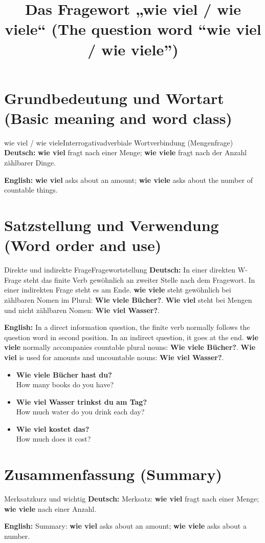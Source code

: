 \documentclass[a4paper,11pt]{article}
\title{Das Fragewort „wie viel / wie viele“ (The question word “wie viel / wie viele”)}
\date{}
\newcommand{\GermanText}[1]{\textbf{Deutsch: }#1\par}
\newcommand{\EnglishText}[1]{{\small\color{SoftGray}\textbf{English: }#1\par}}
\newcommand{\ExampleItem}[2]{\item \textbf{#1}\\{\small\color{SoftGray}#2}}
\begin{document}
\maketitle
\tableofcontents
\newpage
\section{Grundbedeutung und Wortart (Basic meaning and word class)}
\begin{grammarentry}{wie viel / wie viele}{Interrogativadverbiale Wortverbindung (Mengenfrage)}
\GermanText{\textbf{wie viel} fragt nach einer Menge; \textbf{wie viele} fragt nach der Anzahl zählbarer Dinge.}
\EnglishText{\textbf{wie viel} asks about an amount; \textbf{wie viele} asks about the number of countable things.}

\end{grammarentry}
\section{Satzstellung und Verwendung (Word order and use)}
\begin{grammarentry}{Direkte und indirekte Frage}{Fragewortstellung}
\GermanText{In einer direkten W-Frage steht das finite Verb gewöhnlich an zweiter Stelle nach dem Fragewort. In einer indirekten Frage steht es am Ende. \textbf{wie viele} steht gewöhnlich bei zählbaren Nomen im Plural: \textbf{Wie viele Bücher?}. \textbf{Wie viel} steht bei Mengen und nicht zählbaren Nomen: \textbf{Wie viel Wasser?}.}
\EnglishText{In a direct information question, the finite verb normally follows the question word in second position. In an indirect question, it goes at the end. \textbf{wie viele} normally accompanies countable plural nouns: \textbf{Wie viele Bücher?}. \textbf{Wie viel} is used for amounts and uncountable nouns: \textbf{Wie viel Wasser?}.}
\end{grammarentry}
\begin{exbox}\begin{itemize}
\ExampleItem{Wie viele Bücher hast du?}{How many books do you have?}
\ExampleItem{Wie viel Wasser trinkst du am Tag?}{How much water do you drink each day?}
\ExampleItem{Wie viel kostet das?}{How much does it cost?}
\end{itemize}\end{exbox}
\section{Zusammenfassung (Summary)}
\begin{grammarentry}{Merksatz}{kurz und wichtig}
\GermanText{Merksatz: \textbf{wie viel} fragt nach einer Menge; \textbf{wie viele} nach einer Anzahl.}
\EnglishText{Summary: \textbf{wie viel} asks about an amount; \textbf{wie viele} asks about a number.}
\end{grammarentry}
\end{document}
